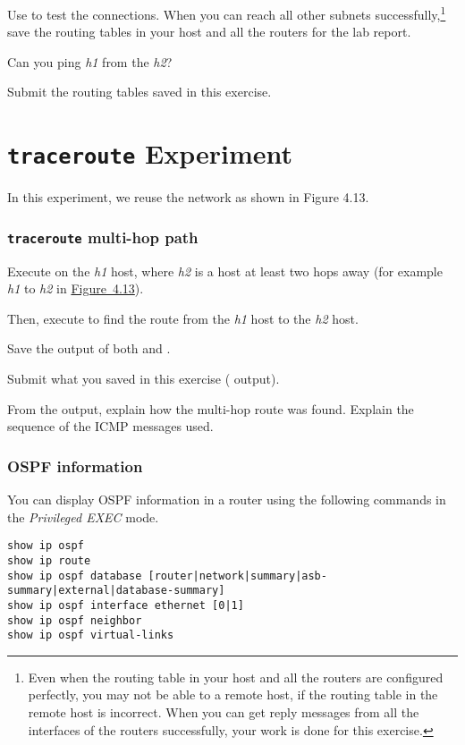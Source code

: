 \documentclass{../UTNetLab}
\begin{document}
    Use  to test the connections.
    When you can reach all other subnets successfully,\footnote{Even when the routing table in your host and all the routers are configured perfectly, you may not be able to  a remote host, if the routing table in the remote host is incorrect.
    When you can get  reply messages from all the interfaces of the routers successfully, your work is done for this exercise.} save the routing tables in your host and all the routers for the lab report.
    
    \begin{report}
        \item Can you ping \textit{h1} from the \textit{h2}?
        
        \item Submit the routing tables saved in this exercise.
    \end{report}


\part{\texttt{traceroute} Experiment}
In this experiment, we reuse the network as shown in Figure 4.13.

\section{\texttt{traceroute} multi-hop path}\label{sec:traceroute}
    Execute  on the \textit{h1} host, where \textit{h2} is a host at least two hops away (for example \textit{h1} to \textit{h2} in \hyperref[fig:4.13]{Figure~4.13}).

    Then, execute  to find the route from the \textit{h1} host to the \textit{h2} host.

    Save the output of both  and .

    \begin{report}
        \item Submit what you saved in this exercise ( output).

        \item From the  output, explain how the multi-hop route was found.
    Explain the sequence of the ICMP messages used.
    \end{report}

\newpage
\appendix

\section{OSPF information}
    You can display OSPF information in a router using the following commands in the \textit{Privileged EXEC} mode.
    \begin{lstlisting}[language={cisco}]
show ip ospf
show ip route
show ip ospf database [router|network|summary|asb-summary|external|database-summary]
show ip ospf interface ethernet [0|1]
show ip ospf neighbor
show ip ospf virtual-links
    \end{lstlisting}
\end{document}
